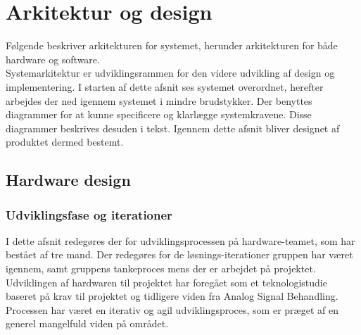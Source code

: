 \chapter{Arkitektur og design}
Følgende beskriver arkitekturen for systemet, herunder arkitekturen for både hardware og software. \\
Systemarkitektur er udviklingsrammen for den videre udvikling af design og implementering. I starten af dette afsnit ses systemet overordnet, herefter arbejdes der ned igennem systemet i mindre brudstykker. Der benyttes diagrammer for at kunne specificere og klarlægge systemkravene. Disse diagrammer beskrives desuden i tekst. Igennem dette afsnit bliver designet af produktet dermed bestemt.
\section{Hardware design}
\subsection{Udviklingsfase og iterationer}
I dette afsnit redegøres der for udviklingsprocessen på hardware-teamet, som har bestået af tre mand. Der redegøres for de løsnings-iterationer gruppen har været igennem, samt gruppens tankeproces mens der er arbejdet på projektet. Udviklingen af hardwaren til projektet har foregået som et teknologistudie baseret på krav til projektet og tidligere viden fra Analog Signal Behandling. Processen har været en iterativ og agil udviklingsproces, som er præget af en generel mangelfuld viden på området.
